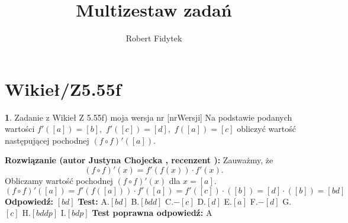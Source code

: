 \documentclass[12pt, a4paper]{article}
\title{Multizestaw zadań}
\author{Robert Fidytek}
\date{}
\theoremstyle{definition} %
\newtheorem{zad}{}
\newcommand{\kategoria}[1]{\section{#1}} %
\newcommand{\zadStart}[1]{\begin{zad}#1\newline} %
\newcommand{\zadStop}{\end{zad}}   %
\newcommand{\rozwStart}[2]{\noindent \textbf{Rozwiązanie (autor #1 , recenzent #2): }\newline} %
\newcommand{\rozwStop}{\newline}                                            %
\newcommand{\odpStart}{\noindent \textbf{Odpowiedź:}\newline}    %
\newcommand{\odpStop}{\newline}                                             %
\newcommand{\testStart}{\noindent \textbf{Test:}\newline} %
\newcommand{\testStop}{\newline} %
\newcommand{\kluczStart}{\noindent \textbf{Test poprawna odpowiedź:}\newline} %
\newcommand{\kluczStop}{\newline} %
\begin{document}
\maketitle


\kategoria{Wikieł/Z5.55f}
\zadStart{Zadanie z Wikieł Z 5.55f) moja wersja nr [nrWersji]}
Na podstawie podanych wartości $f'([a])=[b],$ $f'([c])=[d],$ $f([a])=[c]$ obliczyć wartość następującej pochodnej $(f\circ f)'([a])$.
\zadStop
\rozwStart{Justyna Chojecka}{}
Zauważmy, że 
$$(f \circ f)'(x)=f'(f(x))\cdot f'(x).$$
Obliczamy wartość pochodnej $(f \circ f)'(x)$ dla $x=[a]$.
$$(f \circ f)'([a])=f'(f([a]))\cdot f'([a])=f'([c])\cdot ([b])=[d]\cdot ([b])=[bd]$$
\rozwStop
\odpStart
$[bd]$
\odpStop
\testStart
A.$[bd]$
B.$[bdd]$
C.$-[c]$
D.$[d]$
E.$[a]$
F.$-[d]$
G.$[c]$
H.$[bddp]$
I.$[bdp]$
\testStop
\kluczStart
A
\kluczStop
\end{document}
